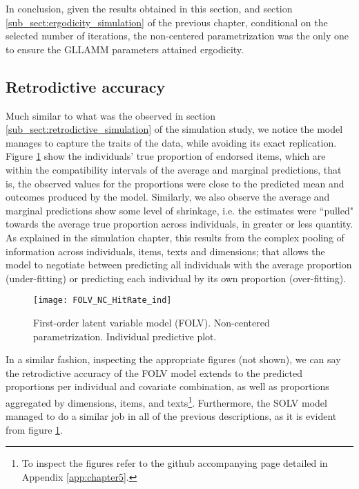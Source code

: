 In conclusion, given the results obtained in this section, and section  \ref{sub_sect:ergodicity_simulation} of the previous chapter, conditional on the selected number of iterations, the non-centered parametrization was the only one to ensure the GLLAMM parameters attained ergodicity.


\subsection{Retrodictive accuracy} \label{sub_sect:retrodictive_application}

Much similar to what was the observed in section \ref{sub_sect:retrodictive_simulation} of the simulation study, we notice the model manages to capture the traits of the data, while avoiding its exact replication. Figure \ref{fig:FOLV_pred_app} show the individuals' true proportion of endorsed items, which are within the compatibility intervals of the average and marginal predictions, that is, the observed values for the proportions were close to the predicted mean and outcomes produced by the model. Similarly, we also observe the average and marginal predictions show some level of shrinkage, i.e. the estimates were ``pulled" towards the average true proportion across individuals, in greater or less quantity. As explained in the simulation chapter, this results from the complex pooling of information across individuals, items, texts and dimensions; that allows the model to negotiate between predicting all individuals with the average proportion (under-fitting) or predicting each individual by its own proportion (over-fitting). 
%
\begin{figure}[H]
	\centering
	\texttt{[image: FOLV\_NC\_HitRate\_ind]}
	\caption[First-order latent variable model (FOLV). Non-centered parametrization. Individual predictive plot.]%
	{First-order latent variable model (FOLV). Non-centered parametrization. Individual predictive plot.}
	\label{fig:FOLV_pred_app}
\end{figure}

In a similar fashion, inspecting the appropriate figures (not shown), we can say the retrodictive accuracy of the FOLV model extends to the predicted proportions per individual and covariate combination, as well as proportions aggregated by dimensions, items, and texts\footnote{To inspect the figures refer to the github accompanying page detailed in Appendix \ref{app:chapter5}.}. Furthermore, the SOLV model managed to do a similar job in all of the previous descriptions, as it is evident from figure \ref{fig:FOLV_pred_app}.

